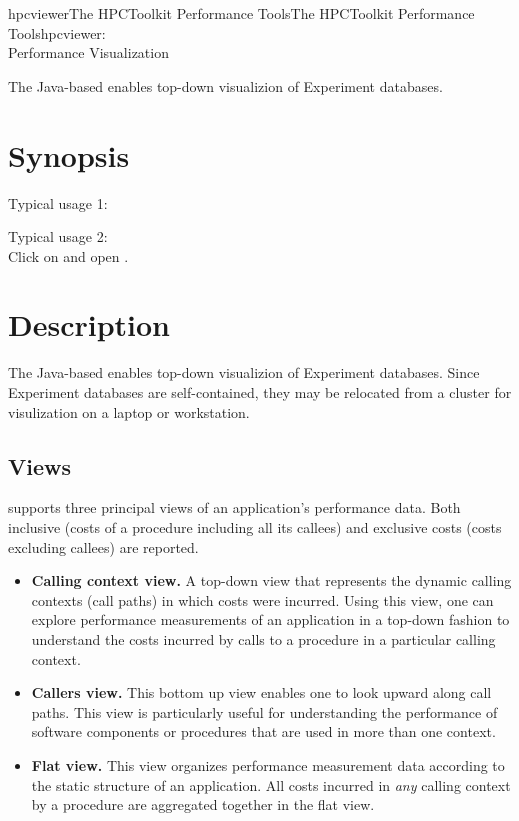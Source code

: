\documentclass[english]{article}
\begin{document}
\begin{Name}{1}{hpcviewer}{The HPCToolkit Performance Tools}{The HPCToolkit Performance Tools}{hpcviewer:\\ Performance Visualization}

The Java-based  enables top-down visualizion of Experiment databases.

\end{Name}

\section{Synopsis}

 

Typical usage 1:\\
 

Typical usage 2:\\
Click on  and open .

\section{Description}

The Java-based  enables top-down visualizion of Experiment databases.
Since Experiment databases are self-contained, they may be relocated from a cluster for visulization on a laptop or workstation.

\subsection{Views}

 supports three principal views of an application's performance data.  Both inclusive (costs of a procedure including all its callees) and exclusive costs (costs excluding callees) are reported.

\begin{itemize}
  \item \textbf{Calling context view.}
A top-down view that represents the dynamic calling contexts (call paths) in which costs were incurred.
Using this view, one can explore performance measurements of an application in a top-down fashion to understand the costs incurred by calls to a procedure in a particular calling context.

  \item \textbf{Callers view.}
This bottom up view enables one to look upward along call paths.
This view is particularly useful for understanding the performance of software components or procedures that are used in more than one context.

  \item \textbf{Flat view.}
This view organizes performance measurement data according to the static structure of an application.
All costs incurred in \emph{any} calling context by a procedure are aggregated together in the flat view.
\end{itemize}
\end{document}
